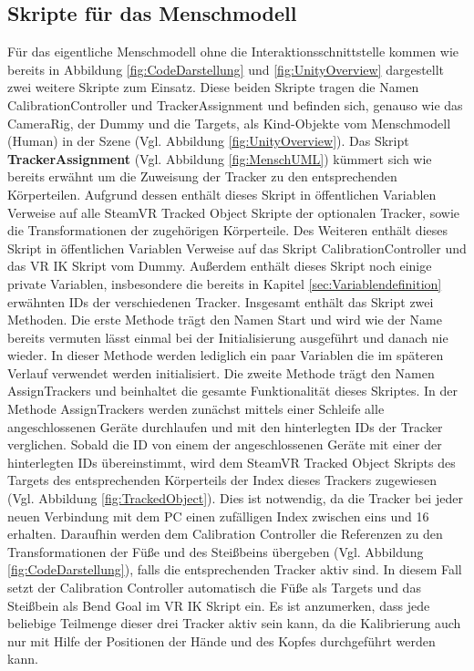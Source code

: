 \subsection{Skripte für das Menschmodell}\label{sec:MMCode}
Für das eigentliche Menschmodell ohne die Interaktionsschnittstelle kommen wie bereits in Abbildung \ref{fig:CodeDarstellung}  und \ref{fig:UnityOverview} dargestellt zwei weitere Skripte zum Einsatz. Diese beiden Skripte tragen die Namen CalibrationController und TrackerAssignment und befinden sich, genauso wie das CameraRig, der Dummy und die Targets, als Kind-Objekte vom Menschmodell (Human) in der Szene (Vgl. Abbildung \ref{fig:UnityOverview}).
\newline\newline
Das Skript \textbf{TrackerAssignment} (Vgl. Abbildung \ref{fig:MenschUML}) kümmert sich wie bereits erwähnt um die Zuweisung der Tracker zu den entsprechenden Körperteilen. Aufgrund dessen enthält dieses Skript in öffentlichen Variablen Verweise auf alle SteamVR Tracked Object Skripte der optionalen Tracker, sowie die Transformationen der zugehörigen Körperteile. Des Weiteren enthält dieses Skript in öffentlichen Variablen Verweise auf das Skript CalibrationController und das VR IK Skript vom Dummy. Außerdem enthält dieses Skript noch einige private Variablen, insbesondere die bereits in Kapitel \ref{sec:Variablendefinition} erwähnten IDs der verschiedenen Tracker.
\newline
Insgesamt enthält das Skript zwei Methoden. Die erste Methode trägt den Namen Start und wird wie der Name bereits vermuten lässt einmal bei der Initialisierung ausgeführt und danach nie wieder. In dieser Methode werden lediglich ein paar Variablen die im späteren Verlauf verwendet werden initialisiert. Die zweite Methode trägt den Namen AssignTrackers und beinhaltet die gesamte Funktionalität dieses Skriptes.
In der Methode AssignTrackers werden zunächst mittels einer Schleife alle angeschlossenen Geräte durchlaufen und mit den hinterlegten IDs der Tracker verglichen. Sobald die ID von einem der angeschlossenen Geräte mit einer der hinterlegten IDs übereinstimmt, wird dem SteamVR Tracked Object Skripts des Targets des entsprechenden Körperteils der Index dieses Trackers zugewiesen (Vgl. Abbildung \ref{fig:TrackedObject}). Dies ist notwendig, da die Tracker bei jeder neuen Verbindung mit dem PC einen zufälligen Index zwischen eins und 16 erhalten.
Daraufhin werden dem Calibration Controller die Referenzen zu den Transformationen der Füße und des Steißbeins übergeben (Vgl. Abbildung \ref{fig:CodeDarstellung}), falls die entsprechenden Tracker aktiv sind. In diesem Fall setzt der Calibration Controller automatisch die Füße als Targets und das Steißbein als Bend Goal im VR IK Skript ein. Es ist anzumerken, dass jede beliebige Teilmenge dieser drei Tracker aktiv sein kann, da die Kalibrierung auch nur mit Hilfe der Positionen der Hände und des Kopfes durchgeführt werden kann.
